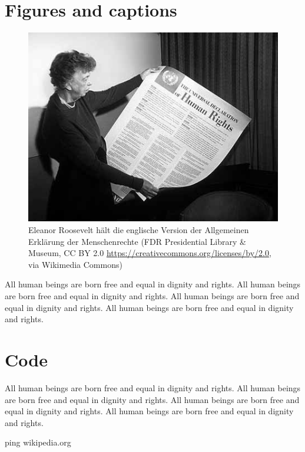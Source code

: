 \documentclass[
  titlepage,
  openright,
  DIV=calc,
  toc=listof,
  listof=nochaptergap]{scrbook}
\newenvironment{Shaded}{}{}
\newcommand{\FunctionTok}[1]{\textcolor[rgb]{0.02,0.16,0.49}{#1}}
\newcommand{\NormalTok}[1]{#1}
\begin{document}
\hypertarget{figures-and-captions}{%
\section{Figures and captions}\label{figures-and-captions}}

\begin{figure}
\hypertarget{fig:eleanor}{%
\centering
\includegraphics{images/Eleanor_Roosevelt_and_Human_Rights_Declaration.jpeg}
\caption{Eleanor Roosevelt hält die englische Version der Allgemeinen
Erklärung der Menschenrechte (FDR Presidential Library \& Museum, CC BY
2.0 \url{https://creativecommons.org/licenses/by/2.0}, via Wikimedia
Commons)}\label{fig:eleanor}
}
\end{figure}

All human beings are born free and equal in dignity and rights. All
human beings are born free and equal in dignity and rights. All human
beings are born free and equal in dignity and rights. All human beings
are born free and equal in dignity and rights.

\hypertarget{code}{%
\section{Code}\label{code}}

All human beings are born free and equal in dignity and rights. All
human beings are born free and equal in dignity and rights. All human
beings are born free and equal in dignity and rights. All human beings
are born free and equal in dignity and rights.

\begin{Shaded}
\begin{Highlighting}[]
\FunctionTok{ping}\NormalTok{ wikipedia.org}
\end{Highlighting}
\end{Shaded}
\end{document}
